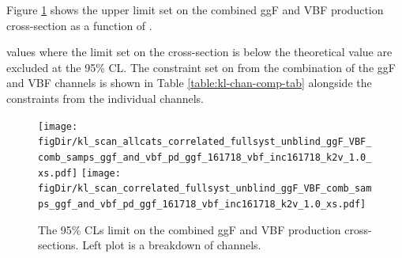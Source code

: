 Figure \ref{fig:comb_kl_scan} shows the upper limit set on the combined ggF and VBF \HH production cross-section as a function of \kl.%


\kl values where the limit set on the cross-section is below the theoretical value are excluded at the 95\% CL. The constraint set on \kl from the combination of the ggF and VBF channels is shown in Table \ref{table:kl-chan-comp-tab} alongside the constraints from the individual channels.

\begin{figure}[h]
	\centering
	\texttt{[image: \\figDir/kl\_scan\_allcats\_correlated\_fullsyst\_unblind\_ggF\_VBF\_comb\_samps\_ggf\_and\_vbf\_pd\_ggf\_161718\_vbf\_inc161718\_k2v\_1.0\_xs.pdf]}
	\texttt{[image: \\figDir/kl\_scan\_correlated\_fullsyst\_unblind\_ggF\_VBF\_comb\_samps\_ggf\_and\_vbf\_pd\_ggf\_161718\_vbf\_inc161718\_k2v\_1.0\_xs.pdf]} %
	\caption{The 95\% CLs limit on the combined ggF and VBF \HH production cross-sections.
	Left plot is a breakdown of channels.
	}
	\label{fig:comb_kl_scan}
\end{figure}


